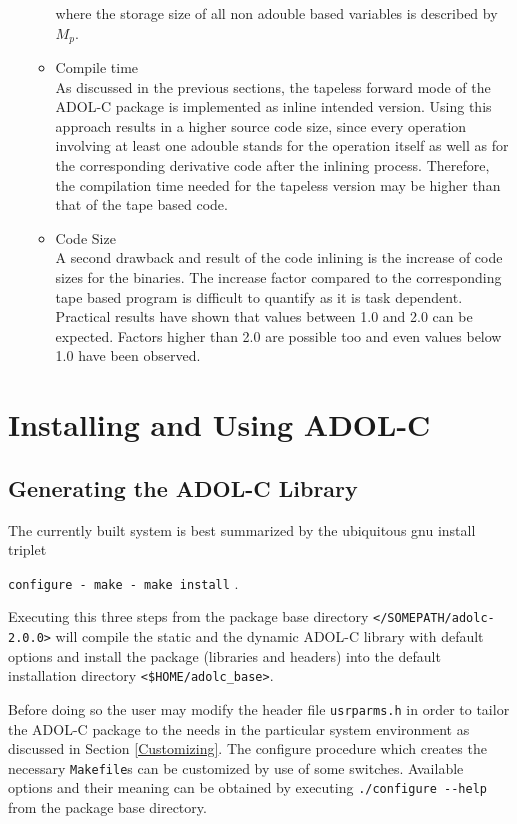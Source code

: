 \documentclass[11pt,twoside]{article}
\begin{document}
\begin{itemize}
\begin{itemize}
      where the storage size of all non {\sf adouble} based variables is described by $M_p$.
    \item Compile time\\
      As discussed in the previous sections, the tapeless forward mode of
      the ADOL-C package is implemented as inline intended version. Using
      this approach results in a higher source code size, since every
      operation involving at least one {\sf adouble} stands for the
      operation itself as well as for the corresponding derivative
      code after the inlining process. Therefore, the compilation time
      needed for the tapeless version may be higher than that of the tape based code. 
    \item Code Size\\
      A second drawback and result of the code inlining is the
      increase of code sizes for the binaries. The increase
      factor compared to the corresponding tape based program is
      difficult to quantify as it is task dependent. Practical results
      have shown that values between 1.0 and 2.0 can be
      expected. Factors higher than 2.0 are possible too and even
      values below 1.0 have been observed. 
    \end{itemize}
\end{itemize}
%
\section{Installing and Using ADOL-C}
\label{install}
%
\subsection{Generating the ADOL-C Library}
\label{genlib}
%
The currently built system is best summarized by the ubiquitous gnu
install triplet 
\begin{center}
\verb=configure - make - make install= .
\end{center}
Executing this three steps from the package base directory
\verb=</SOMEPATH/adolc-2.0.0>= will compile the static and the dynamic
ADOL-C library with default options and install the package (libraries
and headers) into the default installation directory {\tt \verb=<=\$HOME/adolc\_base\verb=>=}.

Before doing so the user may modify the header file \verb=usrparms.h=
in order to tailor the \mbox{ADOL-C} package to the needs in the
particular system environment as discussed in Section
\ref{Customizing}. The configure procedure which creates the necessary
\verb=Makefile=s can be customized by use of some switches. Available
options and their meaning can be obtained by executing
\verb=./configure --help= from the package base directory. 
\end{document}
